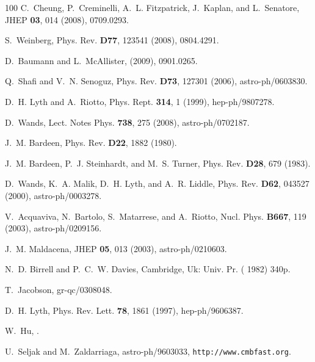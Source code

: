 \documentclass[12pt,letterpaper,rotate]{article}
\begin{document}
{\begin{thebibliography}{100}
C.~Cheung, P.~Creminelli, A.~L. Fitzpatrick, J.~Kaplan, and L.~Senatore,
\newblock JHEP {\bf 03}, 014 (2008), 0709.0293.

S.~Weinberg,
\newblock Phys. Rev. {\bf D77}, 123541 (2008), 0804.4291.

D.~Baumann and L.~McAllister,
\newblock (2009), 0901.0265.

Q.~Shafi and V.~N. Senoguz,
\newblock Phys. Rev. {\bf D73}, 127301 (2006), astro-ph/0603830.

D.~H. Lyth and A.~Riotto,
\newblock Phys. Rept. {\bf 314}, 1 (1999), hep-ph/9807278.

D.~Wands,
\newblock Lect. Notes Phys. {\bf 738}, 275 (2008), astro-ph/0702187.

J.~M. Bardeen,
\newblock Phys. Rev. {\bf D22}, 1882 (1980).

J.~M. Bardeen, P.~J. Steinhardt, and M.~S. Turner,
\newblock Phys. Rev. {\bf D28}, 679 (1983).

D.~Wands, K.~A. Malik, D.~H. Lyth, and A.~R. Liddle,
\newblock Phys. Rev. {\bf D62}, 043527 (2000), astro-ph/0003278.

V.~Acquaviva, N.~Bartolo, S.~Matarrese, and A.~Riotto,
\newblock Nucl. Phys. {\bf B667}, 119 (2003), astro-ph/0209156.

J.~M. Maldacena,
\newblock JHEP {\bf 05}, 013 (2003), astro-ph/0210603.

N.~D. Birrell and P.~C.~W. Davies,
\newblock Cambridge, Uk: Univ. Pr. ( 1982) 340p.

  T.~Jacobson,
\newblock  gr-qc/0308048.
  
D.~H. Lyth,
\newblock Phys. Rev. Lett. {\bf 78}, 1861 (1997), hep-ph/9606387.

W.~Hu,
.

U.~Seljak and M.~Zaldarriaga,
\newblock astro-ph/9603033, {\tt http://www.cmbfast.org}.


\end{thebibliography}}
\end{document}
